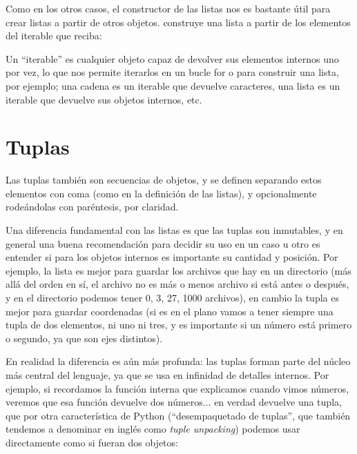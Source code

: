 Como en los otros casos, el constructor de las listas nos es bastante útil para crear listas a partir de otros objetos.  construye una lista a partir de los elementos del iterable que reciba:


\begin{info}
Un ``iterable'' es cualquier objeto capaz de devolver sus elementos internos uno por vez, lo que nos permite iterarlos en un bucle for o para construir una lista, por ejemplo; una cadena es un iterable que devuelve caracteres, una lista es un iterable que devuelve sus objetos internos, etc.
\end{info}


\section{Tuplas}\label{sec:tuplas}

Las tuplas también son secuencias de objetos, y se definen separando estos elementos con coma (como en la definición de las listas), y opcionalmente rodeándolas con paréntesis, por claridad.


Una diferencia fundamental con las listas es que las tuplas son inmutables, y en general una buena recomendación para decidir su uso en un caso u otro es entender si para los objetos internos es importante su cantidad y posición. Por ejemplo, la lista es mejor para guardar los archivos que hay en un directorio (más allá del orden en sí, el archivo no es más o menos archivo si está antes o después, y en el directorio podemos tener 0, 3, 27, 1000 archivos), en cambio la tupla es mejor para guardar coordenadas (si es en el plano vamos a tener siempre una tupla de dos elementos, ni uno ni tres, y es importante si un número está primero o segundo, ya que son ejes distintos).

En realidad la diferencia es aún más profunda: las tuplas forman parte del núcleo más central del lenguaje, ya que se usa en infinidad de detalles internos. Por ejemplo, si recordamos la función interna  que explicamos cuando vimos números, veremos que esa función devuelve dos números... en verdad devuelve una tupla, que por otra característica de Python (``desempaquetado de tuplas'', que también tendemos a denominar en inglés como \textit{tuple unpacking}) podemos usar directamente como si fueran dos objetos:

